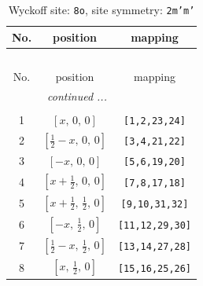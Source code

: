 \documentclass[fleqn,8pt]{jsarticle}
\begin{document}
\begin{longtable}{ccc}
\caption{Wyckoff site: {\tt 8o}, site symmetry: {\tt 2m'm'}}
 \\
 \hline \hline
No. & position & mapping \\ \hline \endfirsthead

\multicolumn{2}{l}{\tablename\ \thetable{}} \\
 \hline \hline
No. & position & mapping \\ \hline \endhead

 \hline \hline
\multicolumn{2}{r}{\footnotesize\it continued ...} \\ \endfoot

 \hline \hline
\multicolumn{2}{r}{} \\ \endlastfoot

1 & $\left[ x,\, 0,\, 0 \right]$ & {\tt [1,2,23,24]} \\ \hline
2 & $\left[ \frac{1}{2} - x,\, 0,\, 0 \right]$ & {\tt [3,4,21,22]} \\ \hline
3 & $\left[ - x,\, 0,\, 0 \right]$ & {\tt [5,6,19,20]} \\ \hline
4 & $\left[ x + \frac{1}{2},\, 0,\, 0 \right]$ & {\tt [7,8,17,18]} \\ \hline
5 & $\left[ x + \frac{1}{2},\, \frac{1}{2},\, 0 \right]$ & {\tt [9,10,31,32]} \\ \hline
6 & $\left[ - x,\, \frac{1}{2},\, 0 \right]$ & {\tt [11,12,29,30]} \\ \hline
7 & $\left[ \frac{1}{2} - x,\, \frac{1}{2},\, 0 \right]$ & {\tt [13,14,27,28]} \\ \hline
8 & $\left[ x,\, \frac{1}{2},\, 0 \right]$ & {\tt [15,16,25,26]} \\
\end{longtable}
\renewcommand{\arraystretch}{1.2}
\end{document}
